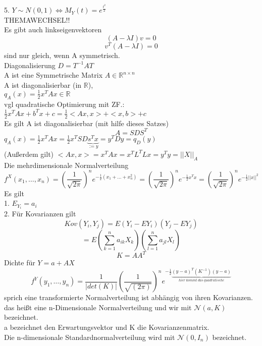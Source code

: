 \documentclass{article}
\begin{document}
	5. $Y\sim N(0,1)\iff M_Y(t)=e^\frac{t^2}{2}$\\
	THEMAWECHSEL!!\\
	Es gibt auch linkseigenvektoren
	\[(A-\lambda I)v=0\]
	\[v^T(A-\lambda I)=0\]
	sind nur gleich, wenn A symmetrisch.\\
	Diagonalisierung $D=T^{-1}AT$\\
	A ist eine Symmetrische Matrix $A\in\mathbb{R}^{n\times n}$\\
	A ist diagonalisierbar (in $\mathbb{R}$),\\
	$q_A(x) = \frac{1}{2}x^T Ax \in\mathbb{R}$\\
	vgl quadratische Optimierung mit ZF.: $\frac{1}{2}x^TAx+b^Tx+c = \frac{1}{2}<Ax,x>+<x,b>+c$\\
	Es gilt A ist diagonalisierbar (mit hilfe dieses Satzes)
	\[A=SDS^T\]
	$q_A(x)=\frac{1}{2}x^TAx =\frac{1}{2}x^TSD\underbrace{s^Tx}_{:=y} = y^TDy = q_D(y)$\\
	(Außerdem gilt) $<Ax,x> = x^TAx = x^TL^TLx = y^Ty= ||X||_A$\\
	Die mehrdimensionale Normalverteilung
	\[f^X(x_1,\dots,x_n)=(\frac{1}{\sqrt{2\pi}})^ne^{-\frac{1}{2}(x_1+\dots+x_n^2)}=(\frac{1}{\sqrt{2\pi}})^ne^{-\frac{1}{2}x^Tx}=(\frac{1}{\sqrt{2\pi}})^ne^{-\frac{1}{2}||x||^2}\]
	Es gilt\\
	1. $E_{Y_i}=a_i$\\
	2. Für Kovarianzen gilt
	\[Kov(Y_i,Y_j) = E(Y_i-EY_i)(Y_j-EY_j)\]
	\[=E(\sum^n_{k=1}a_{ik}X_k)(\sum^n_{l=1}a_{jl}X_l)\]
	\[K=AA^T\]
	Dichte für $Y=a+AX$\\
	\[f^Y(y_1,\dots,y_n)=\frac{1}{|det(K)|}(\frac{1}{\sqrt{(2\pi)}})^n e^{-\frac{1}{2}\underbrace{(y-a)^T(K^{-1})(y-a)}_{hier\ kommt\ das\ quadratische}}\]
	sprich eine transformierte Normalverteilung ist abhängig von ihren Kovarianzen.\\
	das heißt eine n-Dimensionale Normalverteilung und wir mit $\mathcal{N}(a,K)$ bezeichnet.\\
	a bezeichnet den Erwartungsvektor und K die Kovarianzenmatrix.\\
	Die n-dimensionale Standardnormalverteilung wird mit $\mathcal{N}(0,I_n)$ bezeichnet.\\
\end{document}
